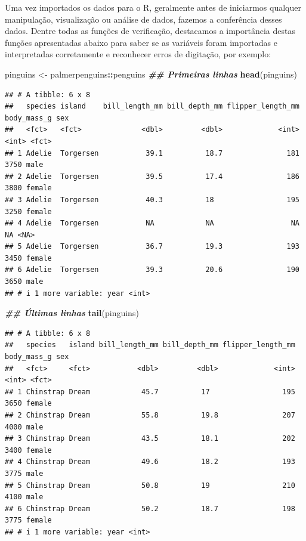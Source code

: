 \documentclass[
]{article}
\newenvironment{Shaded}{\begin{snugshade}}{\end{snugshade}}
\newcommand{\DocumentationTok}[1]{\textcolor[rgb]{0.56,0.35,0.01}{\textbf{\textit{#1}}}}
\newcommand{\FunctionTok}[1]{\textcolor[rgb]{0.13,0.29,0.53}{\textbf{#1}}}
\newcommand{\NormalTok}[1]{#1}
\newcommand{\OtherTok}[1]{\textcolor[rgb]{0.56,0.35,0.01}{#1}}
\newcommand{\SpecialCharTok}[1]{\textcolor[rgb]{0.81,0.36,0.00}{\textbf{#1}}}
\begin{document}
Uma vez importados os dados para o R, geralmente antes de iniciarmos qualquer manipulação, visualização ou análise de dados, fazemos a conferência desses dados. Dentre todas as funções de verificação, destacamos a importância destas funções apresentadas abaixo para saber se as variáveis foram importadas e interpretadas corretamente e reconhecer erros de digitação, por exemplo:

\begin{Shaded}
\begin{Highlighting}[]
\NormalTok{pinguins }\OtherTok{\textless{}{-}}\NormalTok{ palmerpenguins}\SpecialCharTok{::}\NormalTok{penguins}
\DocumentationTok{\#\# Primeiras linhas}
\FunctionTok{head}\NormalTok{(pinguins)}
\end{Highlighting}
\end{Shaded}

\begin{verbatim}
## # A tibble: 6 x 8
##   species island    bill_length_mm bill_depth_mm flipper_length_mm body_mass_g sex   
##   <fct>   <fct>              <dbl>         <dbl>             <int>       <int> <fct> 
## 1 Adelie  Torgersen           39.1          18.7               181        3750 male  
## 2 Adelie  Torgersen           39.5          17.4               186        3800 female
## 3 Adelie  Torgersen           40.3          18                 195        3250 female
## 4 Adelie  Torgersen           NA            NA                  NA          NA <NA>  
## 5 Adelie  Torgersen           36.7          19.3               193        3450 female
## 6 Adelie  Torgersen           39.3          20.6               190        3650 male  
## # i 1 more variable: year <int>
\end{verbatim}

\begin{Shaded}
\begin{Highlighting}[]
\DocumentationTok{\#\# Últimas linhas}
\FunctionTok{tail}\NormalTok{(pinguins)}
\end{Highlighting}
\end{Shaded}

\begin{verbatim}
## # A tibble: 6 x 8
##   species   island bill_length_mm bill_depth_mm flipper_length_mm body_mass_g sex   
##   <fct>     <fct>           <dbl>         <dbl>             <int>       <int> <fct> 
## 1 Chinstrap Dream            45.7          17                 195        3650 female
## 2 Chinstrap Dream            55.8          19.8               207        4000 male  
## 3 Chinstrap Dream            43.5          18.1               202        3400 female
## 4 Chinstrap Dream            49.6          18.2               193        3775 male  
## 5 Chinstrap Dream            50.8          19                 210        4100 male  
## 6 Chinstrap Dream            50.2          18.7               198        3775 female
## # i 1 more variable: year <int>
\end{verbatim}
\end{document}
